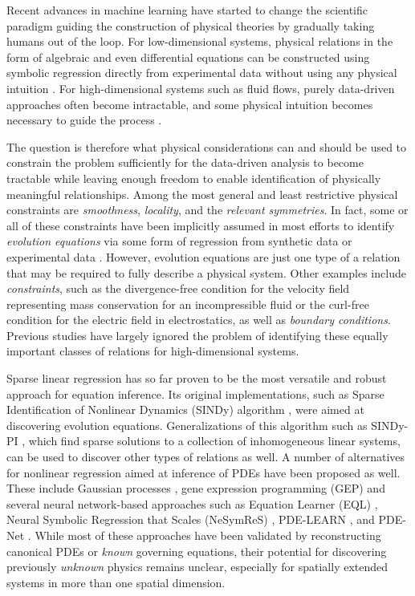 \documentclass[preprint]{article}
\begin{document}
Recent advances in machine learning have started to change the scientific paradigm guiding the construction of physical theories by gradually taking humans out of the loop. For low-dimensional systems, physical relations in the form of algebraic and even differential equations can be constructed using symbolic regression directly from experimental data without using any physical intuition \citep{crutchfield1987,bongard2007,schmidt2009}. For high-dimensional systems such as fluid flows, purely data-driven approaches often become intractable, and some physical intuition becomes necessary to guide the process \citep{karpatne2017}. 

The question is therefore what physical considerations can and should be used to constrain the problem sufficiently for the data-driven analysis to become tractable while leaving enough freedom to enable identification of physically meaningful relationships. Among the most general and least restrictive physical constraints are {\it smoothness}, {\it locality}, and the {\it relevant symmetries}. In fact, some or all of these constraints have been implicitly assumed in most efforts to identify {\it evolution equations} via some form of regression from synthetic data \citep{bar1999,xu2008,rudy2017,schaeffer2017,reinbold2020} or experimental data \citep{reinbold2021}. However, evolution equations are just one type of a relation that may be required to fully describe a physical system. Other examples include {\it constraints}, such as the divergence-free condition for the velocity field representing mass conservation for an incompressible fluid or the curl-free condition for the electric field in electrostatics, as well as {\it boundary conditions}. Previous studies have largely ignored the problem of identifying these equally important classes of relations for high-dimensional systems.

Sparse linear regression has so far proven to be the most versatile and robust approach for equation inference. Its original implementations, such as Sparse Identification of Nonlinear Dynamics (SINDy) algorithm \citep{brunton2016}, were aimed at discovering evolution equations. Generalizations of this algorithm such as SINDy-PI \citep{kaheman2020}, which find sparse solutions to a collection of inhomogeneous linear systems, can be used to discover other types of relations as well. 
A number of alternatives for nonlinear regression aimed at inference of PDEs have been proposed as well. These include Gaussian processes \citep{raissi2018}, gene expression programming (GEP) \citep{ferreira2001, xing2022,ma2022} and several neural network-based approaches such as Equation Learner (EQL) \citep{martius2016,sahoo2018}, Neural Symbolic Regression that Scales (NeSymReS) \citep{biggio2021}, PDE-LEARN \citep{stephany2022}, and PDE-Net \citep{long2018}. While most of these approaches have been validated by reconstructing canonical PDEs or {\it known} governing equations, their potential for discovering previously {\it unknown} physics remains unclear, especially for spatially extended systems in more than one spatial dimension.
\end{document}
